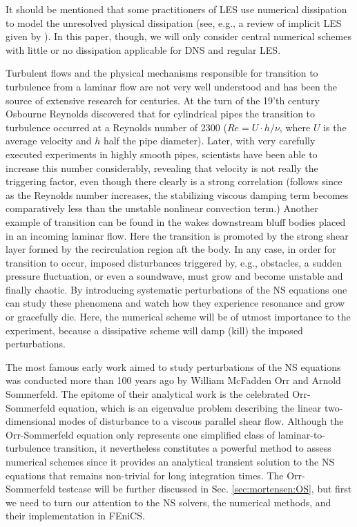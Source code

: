 It should be mentioned that some practitioners of LES use numerical dissipation to model the unresolved physical dissipation (see, e.g., a review of implicit LES given by \cite{Iles}). In this paper, though, we will only consider central numerical schemes with little or no dissipation applicable for DNS and regular LES.

Turbulent flows and the physical mechanisms responsible for transition to turbulence from a laminar flow are not very well understood and has been the source of extensive research for centuries. At the turn of the 19'th century Osbourne Reynolds discovered that for cylindrical pipes the transition to turbulence occurred at a Reynolds number of 2300 ($Re=U\cdot h/\nu$, where $U$ is the average velocity and $h$ half the pipe diameter). Later, with very carefully executed experiments in highly smooth pipes, scientists have been able to increase this number considerably, revealing that velocity is not really the triggering factor, even though there clearly is a strong correlation (follows since as the Reynolds number increases, the stabilizing viscous damping term becomes comparatively less than the unstable nonlinear convection term.) Another example of transition can be found in the wakes downstream bluff bodies placed in an incoming laminar flow. Here the transition is promoted by the strong shear layer formed by the recirculation region aft the body. In any case, in order for transition to occur, imposed disturbances triggered by, e.g., obstacles, a sudden pressure fluctuation, or even a soundwave, must grow and become unstable and finally chaotic. By introducing systematic perturbations of the NS equations one can study these phenomena and watch how they experience resonance and grow or gracefully die. Here, the numerical scheme will be of utmost importance to the experiment, because a dissipative scheme will damp (kill) the imposed perturbations.

The most famous early work aimed to study perturbations of the NS equations was conducted more than 100 years ago by William McFadden Orr and Arnold Sommerfeld. The epitome of their analytical work is the celebrated Orr-Sommerfeld equation, which is an eigenvalue problem describing the linear two-dimensional modes of disturbance to a viscous parallel shear flow. Although the Orr-Sommerfeld equation only represents one simplified class of laminar-to-turbulence transition, it nevertheless constitutes a powerful method to assess numerical schemes since it provides an analytical transient solution to the NS equations that remains non-trivial for long integration times. The Orr-Sommerfeld testcase will be further discussed in Sec. \ref{sec:mortensen:OS}, but first we need to turn our attention to the NS solvers, the numerical methods, and their implementation in FEniCS.

